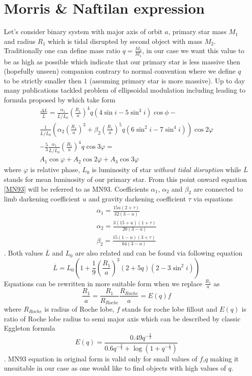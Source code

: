 \documentclass{pracalicmgr}
\begin{document}
\section{Morris \& Naftilan expression}
\hspace{1cm} Let's consider binary system with major axis of orbit $a$, primary star mass $M_1$ and radius $R_1$ which is tidal disrupted by second object with mass $M_2$.
Traditionally one can define mass ratio $q=\frac{M_2}{M_1}$, in our case we want this value to be as high as possible which indicate that our primary star
is less massive then (hopefully unseen) companion contrary to normal convention where we define $q$ to be strictly smaller then $1$ (assuming primary star is more massive).
Up to day many publications tackled problem of ellipsoidal modulation including \citep{kopal_close_1959} leading to formula proposed by \citep{morris_equations_1993} which take 
form 
\begin{align}\label{MN93}
    \frac{\Delta{L}}{\overline{L}}=\frac{\alpha_1}{\overline{L}/L_0}\left(\frac{R_1}{a}\right)^4q\left(4\sin{i}-5\sin^3{i}\right)\cos{\phi}- \\
    \frac{1}{\overline{L}/L_0}\left(\alpha_2\left(\frac{R_1}{a}\right)^3+\beta_2
    \left(\frac{R_1}{a}\right)^5q\left(6\sin^2{i}-7\sin^4{i}\right)\right)\cos{2\varphi} \\
    -\frac{5}{3}\frac{\alpha_1}{\overline{L}/L_0}\left(\frac{R_1}{a}\right)^4q\cos{3\varphi}=\\
    A_1\cos{\varphi}+A_2\cos{2\varphi}+A_3\cos{3\varphi}
\end{align}
where $\varphi$ is relative phase, $L_0$ is luminosity of star {\it without tidal disruption} while $\overline{L}$ stands for mean luminosity of our primary star. From this point
onward equation \ref{MN93} will be referred to as MN93.
Coefficients $\alpha_1$, $\alpha_2$ and
$\beta_2$ are connected to limb darkening coefficient $u$ and gravity darkening coefficient $\tau$ via equations
\begin{align}
    \alpha_1=\frac{15u(2+\tau)}{32(3-u)}\\
    \alpha_2=\frac{3(15+u)(1+\tau)}{20(3-u)}\\
    \beta_2=\frac{15(1-u)(3+\tau)}{64(3-u)}
\end{align}. 
Both values $\overline{L}$ and $L_0$ are also related and can be found via following equation
\begin{equation}
    \overline{L}=L_0\left(1+\frac{1}{9}\left(\frac{R_1}{a}\right)^3(2+5q)(2-3\sin^2{i})\right)
\end{equation}
Equations can be rewritten in more suitable form when we replace $\frac{R_1}{a}$ as
$$\frac{R_1}{a}=\frac{R_1}{R_{Roche}}\frac{R_{Roche}}{a}=E(q)f$$ 
where $R_{Roche}$ 
is radius of Roche lobe, $f$ stands for roche lobe fillout and $E(q)$ is ratio of Roche lobe radius to semi major axis which can be described by classic Eggleton formula 
\citep{eggleton_approximations_1983}
\begin{equation}
    E(q)=\frac{0.49q^{-\frac{2}{3}}}{0.6q^{-\frac{2}{3}}+\log{(1+q^{-\frac{1}{3}})}}
\end{equation}. 
MN93 equation in original form is valid only for small values of $f$,$q$ making it unsuitable in our case as one would like to find objects with high values of $q$.
\end{document}
